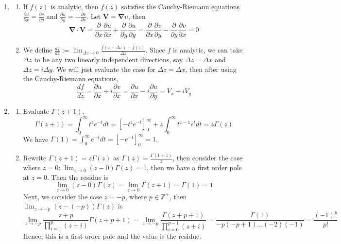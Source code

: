 \documentclass[a4paper]{article}
\begin{document}
\begin{ans}\leavevmode
\begin{enumerate}[label=(\roman*)]
\item 
\begin{enumerate}[label=(\alph*)]
\item If $f(z)$ is analytic, then $f(z)$ satisfies the Cauchy-Riemann equations $\frac{\partial u}{\partial x}=\frac{\partial v}{\partial y}$ and $\frac{\partial u}{\partial y}=-\frac{\partial v}{\partial x}$. Let $\mathbf{V}=\boldsymbol{\nabla}u$, then 
$$\boldsymbol{\nabla}\cdot\mathbf{V}=\frac{\partial}{\partial x}\frac{\partial u}{\partial x}+\frac{\partial}{\partial y}\frac{\partial u}{\partial y}=\frac{\partial}{\partial x}\frac{\partial v}{\partial y}-\frac{\partial}{\partial y}\frac{\partial v}{\partial x}=0$$
\item We define $\frac{df}{dz}:=\lim_{\Delta z\rightarrow 0}\frac{f(z+\Delta z)-f(z)}{\Delta z}$. Since $f$ is analytic, we can take $\Delta z$ to be any two linearly independent directions, say $\Delta z=\Delta x$ and $\Delta z=i\Delta y$. We will just evaluate the case for $\Delta z=\Delta x$, then after using the Cauchy-Riemann equations,
$$\frac{df}{dz}=\frac{\partial u}{\partial x}+i\frac{\partial v}{\partial x}=\frac{\partial u}{\partial x}-i\frac{\partial u}{\partial y}=V_x-iV_y$$
\end{enumerate}
\item 
\begin{enumerate}[label=(\alph*)]
\item Evaluate $\Gamma(z+1)$,
$$\Gamma(z+1)=\int_0^\infty t^ze^{-t}dt=[-t^ze^{-t}]_0^\infty +z\int_0^\infty t^{z-1}e^tdt=z\Gamma(z)$$
We have $\Gamma(1)=\int_0^\infty e^{-t}dt=[-e^{-t}]_0^\infty=1$.
\item Rewrite $\Gamma(z+1)=z\Gamma(z)$ as $\Gamma(z)=\frac{\Gamma(1+z)}{z}$, then consider the case where $z=0$: $\lim_{z\rightarrow0}(z-0)\Gamma(z)=1$, then we have a first order pole at $z=0$. Then the residue is 
$$\lim_{z\rightarrow 0}(z-0)\Gamma(z)=\lim_{z\rightarrow 0}\Gamma(z+1)=\Gamma(1)=1$$
Next, we consider the case $z=-p$, where $p\in\mathbb{Z}^+$, then  
$\lim_{z\rightarrow -p}(z-(-p))\Gamma(z)$ is
$$\lim_{z\rightarrow -p}\frac{z+p}{\prod_{i=1}^p(z+i)}\Gamma(z+p+1)=\lim_{z\rightarrow -p}\frac{\Gamma(z+p+1)}{\prod_{i=0}^{p-1}(z+i)}=\frac{\Gamma(1)}{-p(-p+1)...(-2)(-1)}=\frac{(-1)^p}{p!}$$
Hence, this is a first-order pole and the value is the residue.
\end{enumerate}
\end{enumerate}
\end{ans}
\end{document}
